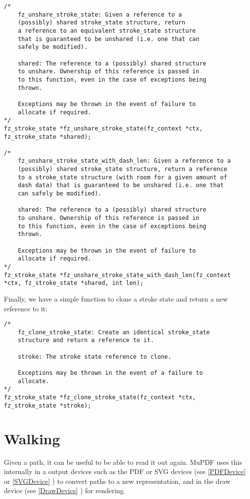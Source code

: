 \documentclass[oneside]{book}
\newcommand{\rjwref}[1] {\autoref{#1} \nameref{#1}}
\begin{document}
\begin{lstlisting}
/*
	fz_unshare_stroke_state: Given a reference to a
	(possibly) shared stroke_state structure, return
	a reference to an equivalent stroke_state structure
	that is guaranteed to be unshared (i.e. one that can
	safely be modified).

	shared: The reference to a (possibly) shared structure
	to unshare. Ownership of this reference is passed in
	to this function, even in the case of exceptions being
	thrown.

	Exceptions may be thrown in the event of failure to
	allocate if required.
*/
fz_stroke_state *fz_unshare_stroke_state(fz_context *ctx, fz_stroke_state *shared);

/*
	fz_unshare_stroke_state_with_dash_len: Given a reference to a
	(possibly) shared stroke_state structure, return a reference
	to a stroke_state structure (with room for a given amount of
	dash data) that is guaranteed to be unshared (i.e. one that
	can safely be modified).

	shared: The reference to a (possibly) shared structure
	to unshare. Ownership of this reference is passed in
	to this function, even in the case of exceptions being
	thrown.

	Exceptions may be thrown in the event of failure to
	allocate if required.
*/
fz_stroke_state *fz_unshare_stroke_state_with_dash_len(fz_context *ctx, fz_stroke_state *shared, int len);
\end{lstlisting}

Finally, we have a simple function to clone a stroke state and return a new reference to it:

\begin{lstlisting}
/*
	fz_clone_stroke_state: Create an identical stroke_state
	structure and return a reference to it.

	stroke: The stroke state reference to clone.

	Exceptions may be thrown in the event of a failure to
	allocate.
*/
fz_stroke_state *fz_clone_stroke_state(fz_context *ctx, fz_stroke_state *stroke);
\end{lstlisting}

\section{Walking}
\label{PathWalking}

Given a path, it can be useful to be able to read it out again. MuPDF uses this internally in a output devices such as the PDF or SVG devices (see \rjwref{PDFDevice} or \rjwref{SVGDevice}) to convert paths to a new representation, and in the draw device (see \rjwref{DrawDevice}) for rendering.
\end{document}
